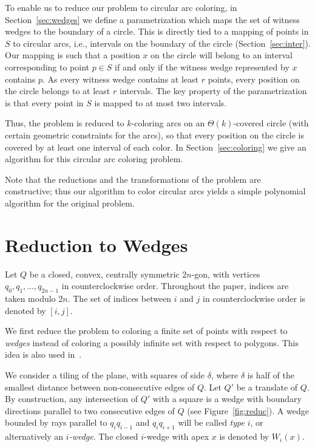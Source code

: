 \documentclass[english,11pt]{article}
\begin{document}
To enable us to reduce our problem to circular arc coloring, in Section~\ref{sec:wedges} we define a parametrization which maps the set of witness wedges to the boundary of a circle.  This is directly tied to a mapping of points in $S$ to circular arcs, i.e., intervals on the boundary of the circle (Section~\ref{sec:inter}). Our mapping is such that a position $x$ on the circle will belong to an interval corresponding to point $p\in S$ if and only if the witness wedge represented by $x$ contains $p$.  As every witness wedge contains at least $r$ points, every position on the circle belongs to at least $r$ intervals. The key property of the parametrization is that every point in $S$ is mapped to at most two intervals. 

Thus, the problem is reduced to $k$-coloring arcs on an $\Theta(k)$-covered circle (with certain geometric constraints for the arcs), so that every position on the circle is covered by at least one interval of each color. In Section~\ref{sec:coloring} we give an algorithm for  this circular arc coloring problem. 

 Note that the reductions and the transformations of the problem are constructive; thus our algorithm to color circular arcs yields a simple polynomial algorithm for the original problem. 

\section{Reduction to Wedges}\label{sec:prel}

Let $Q$ be a closed, convex,  centrally symmetric
$2n$-gon, with vertices $q_0,q_1,\ldots , q_{2n{-}1}$ in counterclockwise
order. Throughout the paper, indices are taken modulo $2n$. 
The set of indices between $i$ and $j$ in counterclockwise order is denoted by $[i,j]$.\medskip


We first  reduce the problem to coloring a finite set of points with respect to {\em wedges} instead of coloring a possibly infinite set with respect to polygons. 
This idea is also used in~\cite{PT07,TT07}.


We consider a tiling of the plane, with squares of side
$\delta$, where $\delta$ is half of the smallest distance
between non-consecutive edges of $Q$.
Let $Q'$ be a translate of $Q$.
By construction, any intersection of $Q'$ with a  square is a
wedge
with boundary directions parallel to two consecutive edges of $Q$
(see Figure~\ref{fig:reduc}).
A wedge bounded by rays parallel to $q_iq_{i{-}1}$ and
$q_iq_{i{+}1}$ will be called  {\em type} $i$, or alternatively an {\em $i$-wedge}. 
The closed $i$-wedge with apex $x$ is denoted by $W_i(x)$. 
\end{document}
